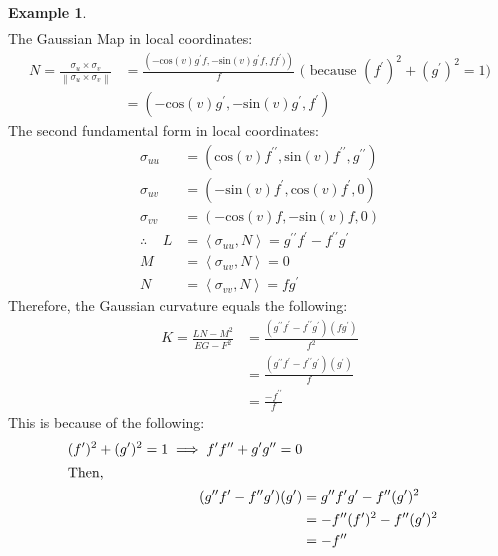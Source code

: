 \documentclass{article}
\theoremstyle{plain}
\theoremstyle{definition}
\newtheorem{example}{Example}
\theoremstyle{remark}
\begin{document}
\begin{example}
\begin{align*}
    \end{align*}
    The Gaussian Map in local coordinates:
    \begin{align*}
        N = \frac{\sigma_u \times \sigma_v }{\left\lVert \sigma_u \times \sigma_v \right\rVert } & =  \frac{\left( -\text{cos}(v)g^{\prime}f, -\text{sin}(v)g^{\prime}f, ff^{\prime} )\right)}{f} \text{  (  because  \((f^{\prime})^2 + (g^{\prime})^2  = 1  ) \)} \\ 
        & = \left( -\text{cos}(v)g^{\prime}, -\text{sin}(v)g^{\prime}, f^{\prime} \right)
    \end{align*}
    The second fundamental form in local coordinates:
    \begin{align*}
        \sigma_{uu} & = (\text{cos}(v)f^{\prime \prime}, \text{sin}(v)f^{\prime \prime}, g^{\prime \prime}) \\
        \sigma_{uv} & = (-\text{sin}(v)f^{\prime}, \text{cos}(v)f^{\prime}, 0) \\
        \sigma_{vv} & = (-\text{cos}(v)f, -\text{sin}(v)f, 0 ) \\
        \therefore \; \; \; \; L & = \left\langle \sigma_{uu}, N \right\rangle = g^{\prime \prime}f^{\prime} -  f^{\prime \prime} g^{\prime}\\
        M & = \left\langle \sigma_{uv} , N \right\rangle = 0 \\
        N & = \left\langle \sigma_{vv} , N \right\rangle = fg^{\prime} 
    \end{align*}
    Therefore, the Gaussian curvature equals the following:
    \begin{align*}
        K = \frac{LN-M^2}{EG-F^2}  & = \frac{(g^{\prime \prime}f^{\prime} -  f^{\prime \prime} g^{\prime})(fg^{\prime} ) }{ f^2} \\
         & =  \frac{(g^{\prime \prime}f^{\prime} -  f^{\prime \prime} g^{\prime})(g^{\prime} ) }{ f} \\
         & = \frac{-f^{\prime \prime}}{f}
    \end{align*}
     This is because of the following:
     \begin{align*}
        (f^{\prime})^2 + (g^{\prime})^2  = 1  \implies f^{\prime}f^{\prime \prime} + g^{\prime}g^{\prime \prime}  = 0 \\
        \shortintertext{Then, }
        (g^{\prime \prime}f^{\prime} -  f^{\prime \prime} g^{\prime})(g^{\prime} ) & = g^{\prime \prime}f^{\prime}g^{\prime}  -  f^{\prime \prime} (g^{\prime})^2 \\
        & =  -f^{\prime \prime}(f^{\prime})^2  -  f^{\prime \prime} (g^{\prime})^2 \\
        & = -f^{\prime \prime}
     \end{align*}
\end{example}
\end{document}
